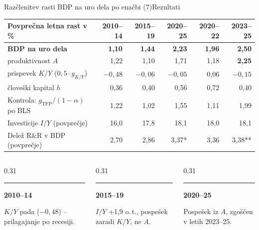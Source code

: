 \documentclass[aspectratio=169,10pt]{beamer}
\makeatletter
\newcommand{\vir}[1]{\gdef\vir@besedilo{#1}}
\gdef\vir@besedilo{}
\newcommand{\kartica}[2]{%
  {\color{accent}\rule{\linewidth}{1pt}}\par\vspace{1.5mm}%
  {\bfseries\normalsize #1}\par\vspace{1mm}%
  {\color{body}\small #2}}
\makeatother
\begin{document}
\begin{frame}{Razčlenitev rasti BDP na uro dela po enačbi (7)}{Rezultati}
\vir{Viri: BLS (2026b); BEA (2026b); NSB (2025); lastni izračun. $\alpha=1/3$; * 2020--2023, ** 2023}
\footnotesize
\renewcommand{\arraystretch}{1.05}
\begin{tabular*}{\textwidth}{@{\extracolsep{\fill}}lrrrrr@{}}
\toprule
\textbf{Povprečna letna rast v \%} & \textbf{2010--14} & \textbf{2015--19} & \textbf{2020--25} & \textbf{2020--22} & {\color{hl}\textbf{2023--25}}\\
\midrule
\textbf{BDP na uro dela} & \textbf{1,10} & \textbf{1,44} & \textbf{2,23} & \textbf{1,96} & {\color{hl}\textbf{2,50}}\\
\quad produktivnost $A$ & 1,22 & 1,10 & 1,71 & 1,18 & {\color{hl}\textbf{2,25}}\\
\quad prispevek $K/Y$ ($0{,}5\cdot g_{K/Y}$) & $-0{,}48$ & $-0{,}06$ & $-0{,}05$ & 0,06 & {\color{hl}$-0{,}15$}\\
\quad človeški kapital $h$ & 0,36 & 0,40 & 0,56 & 0,72 & {\color{hl}0,40}\\
\midrule
Kontrola: $g_{\mathrm{TFP}}/(1-\alpha)$ po BLS & 1,22 & 1,02 & 1,55 & 1,11 & {\color{hl}1,99}\\
Investicije $I/Y$ (povprečje) & 16,0 & 17,8 & 18,1 & 18,0 & {\color{hl}18,1}\\
Delež R\&R v BDP (povprečje) & 2,70 & 2,86 & 3,37* & 3,36 & {\color{hl}3,38**}\\
\bottomrule
\end{tabular*}
\par\vspace{3mm}
\begin{columns}[T,onlytextwidth]
\begin{column}{0.31\textwidth}\kartica{2010--14}{$K/Y$ pada ($-0{,}48$) -- prilagajanje po recesiji.}\end{column}
\begin{column}{0.31\textwidth}\kartica{2015--19}{$I/Y$ +1,9 o.\,t., pospešek zaradi $K/Y$, ne $A$.}\end{column}
\begin{column}{0.31\textwidth}\kartica{\color{hl}2020--25}{Pospešek iz $A$, zgoščen v letih 2023--25.}\end{column}
\end{columns}
\end{frame}
\end{document}
